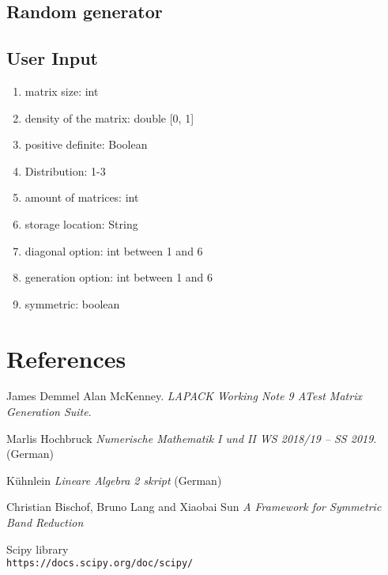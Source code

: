 \documentclass[parskip=full]{scrartcl}
\begin{document}
\subsection{Random generator}

\subsection{User Input}
\begin{enumerate}
	\item matrix size: int
	\item density of the matrix: double [0, 1]
	\item positive definite: Boolean
	\item Distribution: 1-3
	\item amount of matrices: int
	\item storage location: String
	\item diagonal option: int between 1 and 6
	\item generation option: int between 1 and 6
	\item symmetric: boolean
\end{enumerate}

\newpage

\section{References}
\begin{thebibliography}{9}
	James Demmel Alan McKenney. 
	\textit{LAPACK Working Note 9 ATest Matrix Generation Suite}. 
	
	Marlis Hochbruck
	\textit{Numerische Mathematik I und II WS 2018/19 – SS 2019}. (German)  
	
	Kühnlein
	\textit{Lineare Algebra 2 skript} (German)
	
	Christian Bischof, Bruno Lang and Xiaobai Sun
	\textit{A Framework for Symmetric Band Reduction}
	
	Scipy library
	\\\texttt{https://docs.scipy.org/doc/scipy/}


\end{thebibliography}
\end{document}

